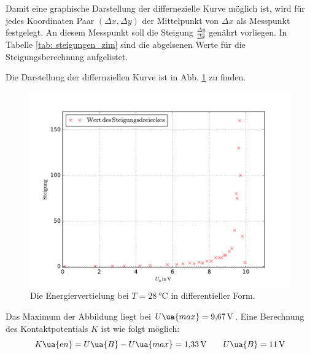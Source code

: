 Damit eine graphische Darstellung der differnezielle Kurve möglich ist, wird für jedes Koordinaten Paar $(\Delta x,\Delta y)$ der Mittelpunkt %
von $\Delta x$ als Messpunkt festgelegt. An diesem Messpunkt soll die Steigung $\frac{\Delta y}{\Delta x}$ genährt vorliegen.
In Tabelle \ref{tab: steigungen_zim} sind die abgelsenen Werte für die Steigungsberechnung aufgelistet.

Die Darstellung der differnziellen Kurve ist in Abb. \ref{fig: energie_zim_diff} zu finden.
\begin{figure}
  \centering
  \includegraphics[width=0.8 \textwidth]{../Messdaten/energie_zim.pdf}
  \caption{Die Energiervertielung bei $T=\SI{28}{\celsius}$ in differentieller Form.} %
  \label{fig: energie_zim_diff}
\end{figure}
Das Maximum der Abbildung liegt bei $U\ua{max}=\SI{9.67}{\volt}$.
Eine Berechnung des Kontaktpotentials $K$ ist wie folgt möglich:
\begin{equation}
\label{eq:k_energie_zim}
  K\ua{en}=U\ua{B}-U\ua{max}=\SI{1.33}{\volt} \qquad U\ua{B}=\SI{11}{\volt} %
\end{equation}
\FloatBarrier %
